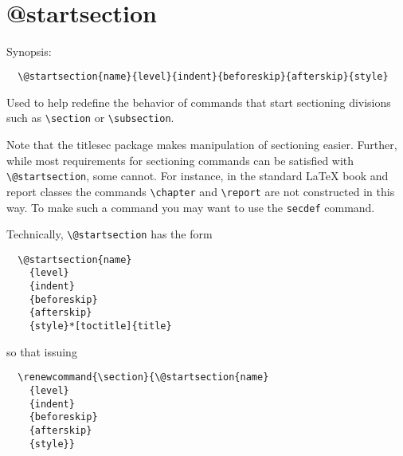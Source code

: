  

\section{\\\\@startsection}

Synopsis:

\begin{verbatim}
  \@startsection{name}{level}{indent}{beforeskip}{afterskip}{style}
\end{verbatim}

Used to help redefine the behavior of commands that start sectioning divisions such as \verb|\section| 
or \verb|\subsection|.

Note that the titlesec package makes manipulation of sectioning easier.
Further, while most requirements for sectioning commands can be satisfied with
\verb|\@startsection|, some cannot. For instance, in the standard LaTeX book and
report classes the commands \verb|\chapter| and \verb|\report| are not constructed in this
way. To make such a command you may want to use the \verb|secdef| command.

Technically, \verb|\@startsection| has the form

\begin{verbatim}
  \@startsection{name}
    {level}
    {indent}
    {beforeskip}
    {afterskip}
    {style}*[toctitle]{title}
\end{verbatim}

so that issuing

\begin{verbatim}
  \renewcommand{\section}{\@startsection{name}
    {level}
    {indent}
    {beforeskip}
    {afterskip}
    {style}}
\end{verbatim}

